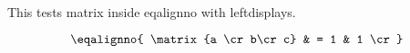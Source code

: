 \ifx\undefined\eplain  \fi

This tests matrix inside eqalignno with leftdisplays.


\loggingall

\leftdisplays
$$\eqalignno{
  \matrix{a \cr b\cr c} & = 1 & 1 \cr
}$$

\bye
